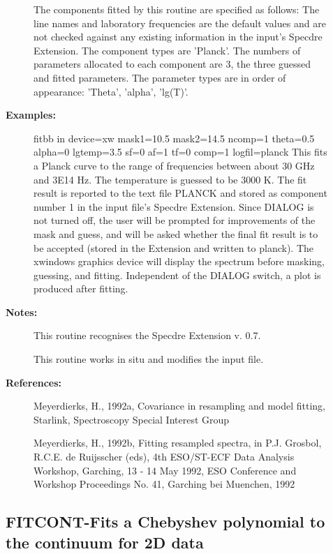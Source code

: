 \begin{description}
\begin{description}
\begin{terminalv}
   The components fitted by this routine are specified as follows:
   The line names and laboratory frequencies are the default values
   and are not checked against any existing information in the
   input's Specdre Extension. The component types are 'Planck'. The
   numbers of parameters allocated to each component are 3, the
   three guessed and fitted parameters. The parameter types are in
   order of appearance: 'Theta', 'alpha', 'lg(T)'.

\end{terminalv}

\item [\textbf{Examples:}]
\begin{terminalv}
fitbb in device=xw mask1=10.5 mask2=14.5
      ncomp=1 theta=0.5 alpha=0 lgtemp=3.5 sf=0 af=1 tf=0
      comp=1 logfil=planck
   This fits a Planck curve to the range of frequencies between
   about 30 GHz and 3E14 Hz. The temperature is guessed to be
   3000 K. The fit result is reported to the text file PLANCK and
   stored as component number 1 in the input file's Specdre
   Extension.
   Since DIALOG is not turned off, the user will be prompted for
   improvements of the mask and guess, and will be asked whether
   the final fit result is to be accepted (stored in the Extension
   and written to planck).
   The xwindows graphics device will display the spectrum before
   masking, guessing, and fitting. Independent of the DIALOG
   switch, a plot is produced after fitting.
\end{terminalv}

\item [\textbf{Notes:}]
This routine recognises the Specdre Extension v. 0.7.

This routine works in situ and modifies the input file.

\item [\textbf{References:}]
   Meyerdierks, H., 1992a, Covariance in resampling and model fitting,
   Starlink, Spectroscopy Special Interest Group

   Meyerdierks, H., 1992b, Fitting resampled spectra, in P.J.
   Grosbol, R.C.E. de Ruijsscher (eds), 4th ESO/ST-ECF Data Analysis
   Workshop, Garching, 13 - 14 May 1992, ESO Conference and Workshop
   Proceedings No. 41, Garching bei Muenchen, 1992

\end{description}
\subsection{FITCONT-\label{FITCONT}Fits a Chebyshev polynomial to the continuum for 2D data}
\begin{description}


\end{description}
\end{description}
